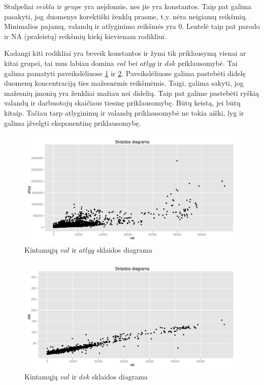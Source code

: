 \documentclass[a4paper]{article}
\begin{document}
Stulpeliai $veikla$ ir $grupe$ yra neįdomūs, nes jie yra
konstantos. Taip pat galima pasakyti, jog duomenys korektiški ženklų
prasme, t.y. nėra neigiamų reikšmių. Minimalios pajamų, valandų ir
atlyginimo reikšmės yra 0. Lentelė taip pat parodo ir NA (praleistų)
reikšmių kiekį kievienam rodikliui.

Kadangi kiti rodikliai yra beveik konstantos ir žymi tik priklausymą
vienai ar kitai grupei, tai mus labiau domina $val$ bei $atlyg$ ir
$dsk$ priklausomybė. Tai galima pamatyti paveikslėliuose
\ref{fig:valatlyg} ir \ref{fig:valdsk}. Paveikslėliuose galima
pastebėti didelę duomenų koncentraciją ties mažesnėmis
reikšmėmis. Taigi, galima sakyti, jog mažesnių įmonių yra ženkliai
mažiau nei didelių. Taip pat galime pastebėti ryškią valandų ir
darbuotojų skaičiaus tiesinę priklausomybę. Būtų keistą, jei būtų
kitaip. Tačiau tarp atlyginimų ir valandų priklausomybė ne tokia
aiški, lyg ir galima įžvelgti eksponentinę priklausomybę.

\begin{figure}[here]
\includegraphics[width=\textwidth]{val_atlyg.pdf}
\caption{Kintamųjų $val$ ir $atlyg$ sklaidos diagrama}
\label{fig:valatlyg}
\end{figure}

\begin{figure}[here]
\includegraphics[width=\textwidth]{val_dsk.pdf}
\caption{Kintamųjų $val$ ir $dsk$ sklaidos diagrama}
\label{fig:valdsk}
\end{figure}
\end{document}
